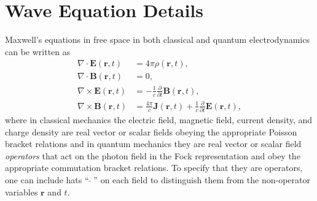 \documentclass{article}
\numberwithin{equation}{section}
\begin{document}
\section{Wave Equation Details}

Maxwell's equations in free space in both classical and quantum electrodynamics can be written as
\begin{equation}
\begin{split}
\nabla\cdot\mathbf{E}(\mathbf{r},t) &= 4\pi\rho(\mathbf{r},t),\\
\nabla\cdot\mathbf{B}(\mathbf{r},t) &= 0,\\
\nabla\times\mathbf{E}(\mathbf{r},t) &= -\frac{1}{c}\frac{\partial}{\partial t}\mathbf{B}(\mathbf{r},t),\\
\nabla\times\mathbf{B}(\mathbf{r},t) &= \frac{4\pi}{c}\mathbf{J}(\mathbf{r},t) + \frac{1}{c}\frac{\partial}{\partial t}\mathbf{E}(\mathbf{r},t),
\end{split}
\end{equation}
where in classical mechanics the electric field, magnetic field, current density, and charge density are real vector or scalar fields obeying the appropriate Poisson bracket relations and in quantum mechanics they are real vector or scalar field \textit{operators} that act on the photon field in the Fock representation and obey the appropriate commutation bracket relations. To specify that they are operators, one can include hats ``$\;\hat{}\;$'' on each field to distinguish them from the non-operator variables $\mathbf{r}$ and $t$.
\end{document}
